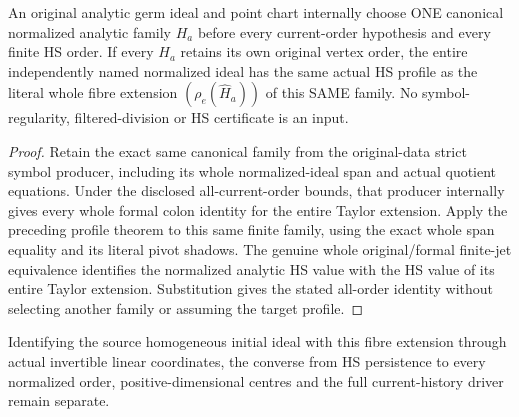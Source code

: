 \begin{theorem}
\label{hir:actual-original-point-order-retaining-fibre-hs-profile}
\leanok
An original analytic germ ideal and point chart internally choose ONE
canonical normalized analytic family $H_a$ before every current-order
hypothesis and every finite HS order. If every $H_a$ retains its own
original vertex order, the entire independently named normalized ideal
has the same actual HS profile as the literal whole fibre extension
$(\rho_e(\widehat H_a))$ of this SAME family. No symbol-regularity,
filtered-division or HS certificate is an input.
\end{theorem}
\begin{proof}
Retain the exact same canonical family from the original-data strict
symbol producer, including its whole normalized-ideal span and actual
quotient equations. Under the disclosed all-current-order bounds,
that producer internally gives every whole formal colon identity for
the entire Taylor extension. Apply the preceding profile theorem to
this same finite family, using the exact whole span equality and its
literal pivot shadows. The genuine whole original/formal finite-jet
equivalence identifies the normalized analytic HS value with the HS
value of its entire Taylor extension. Substitution gives the stated
all-order identity without selecting another family or assuming the
target profile.
\end{proof}

Identifying the source homogeneous initial ideal with this fibre
extension through actual invertible linear coordinates, the converse
from HS persistence to every normalized order, positive-dimensional
centres and the full current-history driver remain separate.
